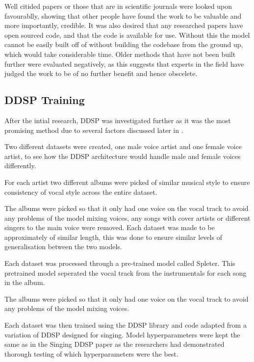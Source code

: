 Well citided papers or those that are in scientific journals were looked upon favourablly, showing that other people have found the work to be valuable and more importantly, credible. It was also desired that any researched papers have open sourced code, and that the code is available for use. Without this the model cannot be easily built off of without building the codebase from the ground up, which would take considerable time. Older methods that have not been built further were evaluated negatively, as this suggests that experts in the field have judged the work to be of no further benefit and hence obscelete.

\subsection{DDSP Training}

After the intial research, DDSP was investigated further as it was the most promising method due to several factors discussed later in .

Two different datasets were created, one male voice artist and one female voice artist, to see how the DDSP architecture would handle male and female voices differently.

For each artist two different albums were picked of similar musical style to ensure consistency of vocal style across the entire dataset.

The albums were picked so that it only had one voice on the vocal track to avoid any problems of the model mixing voices, any songs with cover artists or different singers to the main voice were removed. Each dataset was made to be approximately of similar length, this was done to ensure similar levels of generalisation between the two models.

Each dataset was processed through a pre-trained model called Spleter\cite{Spleeter}. This pretrained model seperated the vocal track from the instrumentals for each song in the album.

The albums were picked so that it only had one voice on the vocal track to avoid any problems of the model mixing voices.

Each dataset was then trained using the DDSP library\cite{DDSPPip} and code adapted from a variation of DDSP designed for singing\cite{SingingDDSP}. Model hyperparameters were kept the same as in the Singing DDSP paper\cite{SingingDDSP} as the researchers had demonstrated thorough testing of which hyperparameters were the best.

